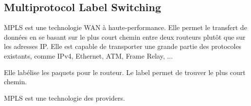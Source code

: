 \subsection{Multiprotocol Label Switching}
MPLS est une technologie WAN à haute-performance.
Elle permet le transfert de données en se basant sur le plus court chemin entre deux routeurs plutôt que sur les adresses IP. 
Elle est capable de transporter une grande partie des protocoles existants, comme IPv4, Ethernet, ATM, Frame Relay, ...

Elle labélise les paquets pour le routeur. 
Le label permet de trouver le plus court chemin.

MPLS est une technologie des providers. 